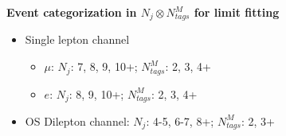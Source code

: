 \documentclass{beamer}
\begin{document}
\begin{frame}
\begin{columns}
\end{columns}
\bigskip
\textbf{Event categorization in $N_{j} \otimes N_{tags}^{M}$ for limit fitting}
\begin{itemize}
	\item{Single lepton channel}
	\begin{itemize}
		\item $\mu$: $N_{j}$: 7, 8, 9, 10+; $N_{tags}^{M}$: 2, 3, 4+
		\item $e$: $N_{j}$: 8, 9, 10+; $N_{tags}^{M}$: 2, 3, 4+
	\end{itemize}
	\item OS Dilepton channel: $N_{j}$: 4-5, 6-7, 8+; $N_{tags}^{M}$: 2, 3+
\end{itemize}
\end{frame}

\end{document}
